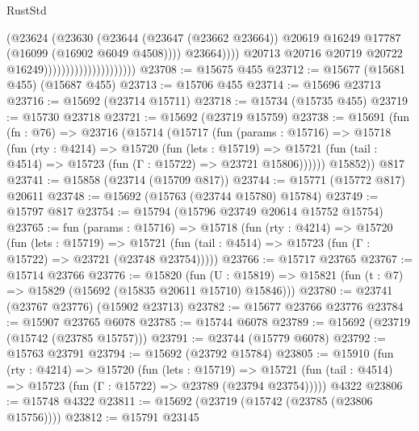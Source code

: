 \begin{lexlean}{RustStd}
\begin{coremodule}
                                                    (@23624
                                                      (@23630
                                                        (@23644
                                                          (@23647 (@23662 @23664))
                                                          @20619
                                                          @16249
                                                          @17787
                                                          (@16099 (@16902 @6049 @4508))))
                                                      @23664))))
                                              @20713
                                              @20716
                                              @20719
                                              @20722
                                              @16249)))))))))))))))))))))
@23708 := @15675 @455
@23712 := @15677 (@15681 @455) (@15687 @455)
@23713 := @15706 @455
@23714 := @15696 @23713
@23716 := @15692 (@23714 @15711)
@23718 := @15734 (@15735 @455)
@23719 := @15730 @23718
@23721 := @15692 (@23719 @15759)
@23738 := @15691
    (fun (fn : @76) =>
    @23716
      (@15714
        (@15717
          (fun (params : @15716) =>
          @15718
            (fun (rty : @4214) =>
            @15720
              (fun (lets : @15719) =>
              @15721 (fun (tail : @4514) => @15723 (fun (Γ : @15722) => @23721 @15806))))))
        @15852))
    @817
@23741 := @15858 (@23714 (@15709 @817))
@23744 := @15771 (@15772 @817) @20611
@23748 := @15692 (@15763 (@23744 @15780) @15784)
@23749 := @15797 @817
@23754 := @15794 (@15796 @23749 @20614 @15752 @15754)
@23765 := fun (params : @15716) =>
  @15718
    (fun (rty : @4214) =>
    @15720
      (fun (lets : @15719) =>
      @15721 (fun (tail : @4514) => @15723 (fun (Γ : @15722) => @23721 (@23748 @23754)))))
@23766 := @15717 @23765
@23767 := @15714 @23766
@23776 := @15820
    (fun (U : @15819) => @15821 (fun (t : @7) => @15829 (@15692 (@15835 @20611 @15710) @15846)))
@23780 := @23741 (@23767 @23776) (@15902 @23713)
@23782 := @15677 @23766 @23776
@23784 := @15907 @23765 @6078
@23785 := @15744 @6078
@23789 := @15692 (@23719 (@15742 (@23785 @15757)))
@23791 := @23744 (@15779 @6078)
@23792 := @15763 @23791
@23794 := @15692 (@23792 @15784)
@23805 := @15910
    (fun (rty : @4214) =>
    @15720
      (fun (lets : @15719) =>
      @15721 (fun (tail : @4514) => @15723 (fun (Γ : @15722) => @23789 (@23794 @23754)))))
    @4322
@23806 := @15748 @4322
@23811 := @15692 (@23719 (@15742 (@23785 (@23806 @15756))))
@23812 := @15791 @23145

\end{coremodule}
\end{lexlean}
